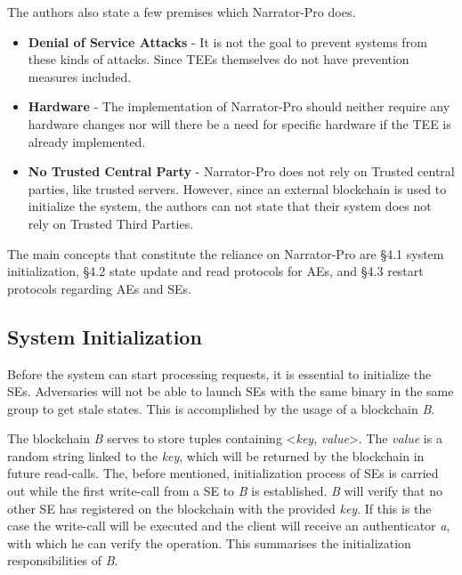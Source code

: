 The authors also state a few premises which Narrator-Pro does. 
\begin{itemize}
    \item \textbf{Denial of Service Attacks} - It is not the goal to prevent systems from these kinds of attacks. Since TEEs themselves do not have prevention measures included.  
    \item \textbf{Hardware} - The implementation of Narrator-Pro should neither require any hardware changes nor will there be a need for specific hardware if the TEE is already implemented.  
    \item \textbf{No Trusted Central Party} - Narrator-Pro does not rely on Trusted central parties, like trusted servers. However, since an external blockchain is used to initialize the system, the authors can not state that their system does not rely on Trusted Third Parties.
\end{itemize} 

The main concepts that constitute the reliance on Narrator-Pro are §4.1 system initialization, §4.2 state update and read protocols for AEs, and §4.3 restart protocols regarding AEs and SEs.

\subsection{System Initialization}

Before the system can start processing requests, it is essential to initialize the SEs. Adversaries will not be able to launch SEs with the same binary in the same group to get stale states. This is accomplished by the usage of a blockchain \textit{B}. 

The blockchain \textit{B} serves to store tuples containing <\textit{key}, \textit{value}>. The \textit{value} is a random string linked to the \textit{key}, which will be returned by the blockchain in future read-calls. The, before mentioned, initialization process of SEs is carried out while the first write-call from a SE to \textit{B} is established. \textit{B} will verify that no other SE has registered on the blockchain with the provided \textit{key}. If this is the case the write-call will be executed and the client will receive an authenticator \textit{a}, with which he can verify the operation. This summarises the initialization responsibilities of \textit{B}.

